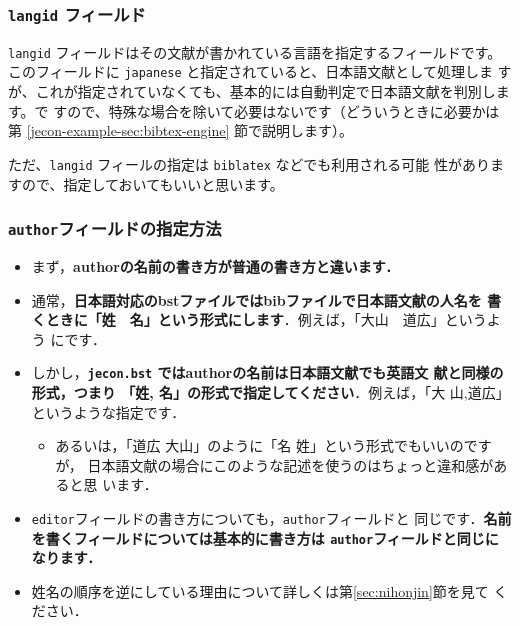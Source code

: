 \documentclass[article]{jlreq}
\begin{document}
\subsubsection{\texttt{langid} フィールド}
\label{jecon-example-sec:langid}

\texttt{langid} フィールドはその文献が書かれている言語を指定するフィールドです。
このフィールドに \texttt{japanese} と指定されていると、日本語文献として処理しま
すが、これが指定されていなくても、基本的には自動判定で日本語文献を判別します。で
すので、特殊な場合を除いて必要はないです（どういうときに必要かは第
\ref{jecon-example-sec:bibtex-engine} 節で説明します）。

ただ、\texttt{langid} フィールの指定は \texttt{biblatex} などでも利用される可能
性がありますので、指定しておいてもいいと思います。



\subsubsection{\texttt{author}フィールドの指定方法}
\label{jecon-example-sec:author}

\begin{itemize}
 \item まず，\textbf{authorの名前の書き方が普通の書き方と違います．}
 \item 通常，\textbf{日本語対応のbstファイルではbibファイルで日本語文献の人名を
       書くときに「姓　名」という形式にします}．例えば，「大山　道広」というよう
       にです．
 \item しかし，\textbf{\texttt{jecon.bst} ではauthorの名前は日本語文献でも英語文
       献と同様の形式，つまり 「姓, 名」の形式で指定してください}．例えば，「大
       山,道広」というような指定です．
       \begin{itemize}
        \item あるいは，「道広 大山」のように「名 姓」という形式でもいいのですが，
              日本語文献の場合にこのような記述を使うのはちょっと違和感があると思
              います．
       \end{itemize}
 \item \texttt{editor}フィールドの書き方についても，\texttt{author}フィールドと
       同じです．\textbf{名前を書くフィールドについては基本的に書き方は
       \texttt{author}フィールドと同じになります．}
 \item 姓名の順序を逆にしている理由について詳しくは第\ref{sec:nihonjin}節を見て
       ください．
\end{itemize}
\end{document}
